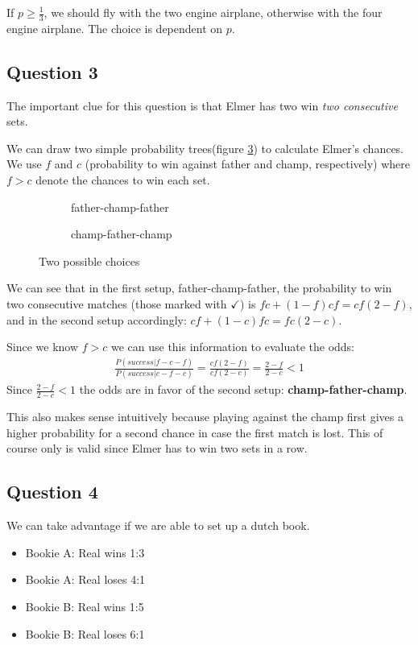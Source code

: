 \documentclass[../main/Notes.tex]{subfiles}
\begin{document}
If $p\geq\frac{1}{3}$, we should fly with the two engine airplane, otherwise with the four engine airplane. The choice is dependent on $p$.



\subsection*{Question 3}
The important clue for this question is that Elmer has two win \textit{two consecutive} sets.

We can draw two simple probability trees(figure \ref{fig:2014-06-06_mt3trees}) to calculate Elmer's chances. We use $f$ and $c$ (probability to win against father and champ, respectively) where $f > c$ denote the chances to win each set.
\begin{figure}[!ht]
  \centering
  \begin{subfigure}{.45\linewidth}
    \centering
    
    \caption{father-champ-father}
    \label{fig:2014-06-06_mt3tree1}
  \end{subfigure}
  \begin{subfigure}{.45\linewidth}
    \centering
    
    \caption{champ-father-champ}
    \label{fig:2014-06-06_mt3tree2}
  \end{subfigure}
  \caption{Two possible choices}
  \label{fig:2014-06-06_mt3trees}
\end{figure}

We can see that in the first setup, father-champ-father, the probability to win two consecutive matches (those marked with $\checkmark$) is $fc+(1-f)cf=cf(2-f)$, and in the second setup accordingly: $cf+(1-c)fc=fc(2-c)$.

Since we know $f>c$ we can use this information to evaluate the odds:
\begin{align*}
\frac{P(success|f-c-f)}{P(success|c-f-c)} = \frac{cf(2-f)}{cf(2-c)} = \frac{2-f}{2-c} < 1
\end{align*}
Since $\frac{2-f}{2-c} < 1$ the odds are in favor of the second setup: \textbf{champ-father-champ}.

This also makes sense intuitively because playing against the champ first gives a higher probability for a second chance in case the first match is lost. This of course only is valid since Elmer has to win two sets in a row.



\subsection*{Question 4}
We can take advantage if we are able to set up a dutch book.
\begin{itemize}
	\item Bookie A: Real wins 1:3
  \item Bookie A: Real loses 4:1
	\item Bookie B: Real wins 1:5
  \item Bookie B: Real loses 6:1
\end{itemize}
\end{document}
